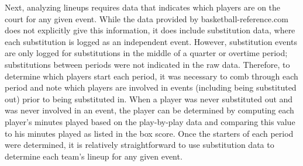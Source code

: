 Next, analyzing lineups requires data that indicates which players are on the court
for any given event. While the data provided by basketball-reference.com does not
explicitly give this information, it does include substitution data, where each
substitution is logged as an independent event. However, substitution events are
only logged for substitutions in the middle of a quarter or overtime period;
substitutions between periods were not indicated in the raw data. Therefore, to
determine which players start each period, it was necessary to comb through each
period and note which players are involved in events (including being substituted
out) prior to being substituted in. When a player was never substituted out and was
never involved in an event, the player can be determined by computing each player's
minutes played based on the play-by-play data and comparing this value to his
minutes played as listed in the box score. Once the starters of each period were
determined, it is relatively straightforward to use substitution data to determine
each team's lineup for any given event.


